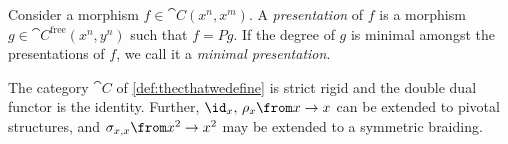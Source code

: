 \begin{definition}\label{def: degree of morphism}
  Consider a morphism \(f \in \cat{C}(x^n, x^m)\).
  A \emph{presentation} of \(f\) is a morphism \(g \in \cat{C}^{\text{free}}(x^n,y^n)\) such that \(f = Pg\).
  If the degree of \(g\) is minimal amongst the presentations of \(f\), we call it a \emph{minimal presentation}.
\end{definition}

\begin{theorem}\label{thm: counterexample_underlying_cat_properties}
  The category \(\cat{C}\) of \cref{def:thecthatwedefine}
  is strict rigid and the double dual functor is the identity.
  Further,
  \(\id_x,\, \rho_x\from x \to x\) can be extended to pivotal structures,
  and \(\sigma_{x,x}\from x^2 \to x^2\) may be extended to a symmetric braiding.
\end{theorem}
